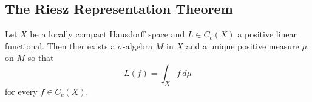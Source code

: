 \subsection{The Riesz Representation Theorem}
\bigskip

\begin{theorem}\label{thm:riesz_representation}
    Let \( X \) be a locally compact Hausdorff space and \( L \in C_c(X) \) a positive linear functional. 
    Then ther exists a \( \sigma \)-algebra \( M \) in \( X \) and a unique positive measure 
    \( \mu \) on \( M \) so that
    \[
        L(f) = \int_X f\,d\mu
    \]
    for every \( f \in C_c(X) \).
\end{theorem}
\bigskip
